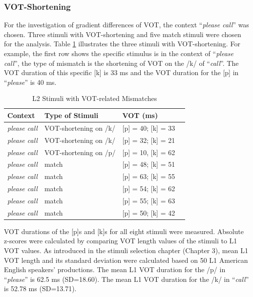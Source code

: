 \subsubsection{VOT-Shortening}
For the investigation of gradient differences of VOT, the context “\textit{please call}” was chosen. Three stimuli with VOT-shortening and five match stimuli were chosen for the analysis. Table \ref{tab:vot2} illustrates the three stimuli with VOT-shortening. For example, the first row shows the specific stimulus is in the context of “\textit{please call}”, the type of mismatch is the shortening of VOT on the /k/ of “\textit{call}”. The VOT duration of this specific [k] is 33 ms and the VOT duration for the [p] in “\textit{please}” is 40 ms. 

\begin{table}[h]
  \figSpace
  \centering
  \caption{L2 Stimuli with VOT-related Mismatches}
    \begin{tabular}{llll}
    \toprule
    Context & Type of Stimuli & VOT (ms) \\
    \midrule
    \textit{please call} & VOT-shortening on /k/ & [p] = 40; [k] = 33 \\
    \textit{please call} & VOT-shortening on /k/ & [p] = 32; [k] = 21 \\
    \textit{please call} & VOT-shortening on /p/ & [p] = 10, [k] = 62 \\
    \textit{please call} & match & [p] = 48; [k] = 51 \\
    \textit{please call} & match & [p] = 63; [k] = 55 \\
    \textit{please call} & match & [p] = 54; [k] = 62 \\
    \textit{please call} & match & [p] = 55; [k] = 63 \\
    \textit{please call} & match & [p] = 50; [k] = 42 \\
    \bottomrule
    \end{tabular}%
  \label{tab:vot2}%
    \figSpace
\end{table}%

VOT durations of the [p]s and [k]s for all eight stimuli were measured. Absolute z-scores were calculated by comparing VOT length values of the stimuli to L1 VOT values. As introduced in the stimuli selection chapter (Chapter 3), mean L1 VOT length and its standard deviation were calculated based on 50 L1 American English speakers’ productions. The mean L1 VOT duration for the /p/ in “\textit{please}” is 62.5 ms (SD=18.60). The mean L1 VOT duration for the /k/ in “\textit{call}” is 52.78 ms (SD=13.71).

